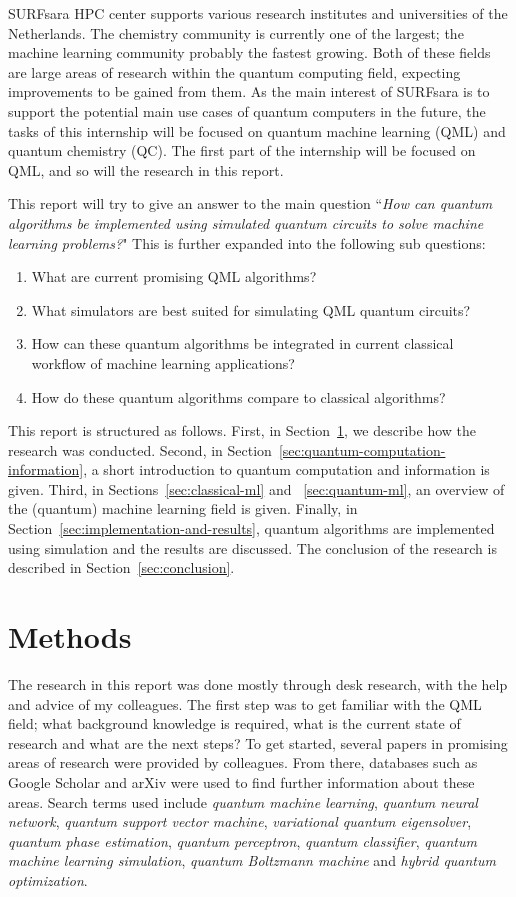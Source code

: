 \documentclass[a4paper,10pt]{article}
\begin{document}
SURFsara HPC center supports various research institutes and universities of the Netherlands.
The chemistry community is currently one of the largest; the machine learning community probably the fastest growing.
Both of these fields are large areas of research within the quantum computing field, expecting improvements to be gained from them.
As the main interest of SURFsara is to support the potential main use cases of quantum computers in the future, the tasks of this internship will be focused on quantum machine learning (QML) and quantum chemistry (QC).
The first part of the internship will be focused on QML, and so will the research in this report.

This report will try to give an answer to the main question ``\emph{How can quantum algorithms be implemented using simulated quantum circuits to solve machine learning problems?}"
This is further expanded into the following sub questions:
\begin{enumerate}
	\item What are current promising QML algorithms?
	\item What simulators are best suited for simulating QML quantum circuits?
	\item How can these quantum algorithms be integrated in current classical workflow of machine learning applications?
	\item How do these quantum algorithms compare to classical algorithms?
\end{enumerate}

This report is structured as follows. First, in Section~\ref{sec:methods}, we describe how the research was conducted.
Second, in Section~\ref{sec:quantum-computation-information}, a short introduction to quantum computation and information is given.
Third, in Sections~\ref{sec:classical-ml} and ~\ref{sec:quantum-ml}, an overview of the (quantum) machine learning field is given.
Finally, in Section~\ref{sec:implementation-and-results}, quantum algorithms are implemented using simulation and the results are discussed.
The conclusion of the research is described in Section~\ref{sec:conclusion}.

\section{Methods} \label{sec:methods}
The research in this report was done mostly through desk research, with the help and advice of my colleagues.
The first step was to get familiar with the QML field; what background knowledge is required, what is the current state of research and what are the next steps?
To get started, several papers in promising areas of research were provided by colleagues. 
From there, databases such as Google Scholar and arXiv were used to find further information about these areas.
Search terms used include \emph{quantum machine learning}, \emph{quantum neural network}, \emph{quantum support vector machine}, \emph{variational quantum eigensolver}, \emph{quantum phase estimation}, \emph{quantum perceptron}, \emph{quantum classifier}, \emph{quantum machine learning simulation}, \emph{quantum Boltzmann machine} and \emph{hybrid quantum optimization}.
\end{document}
